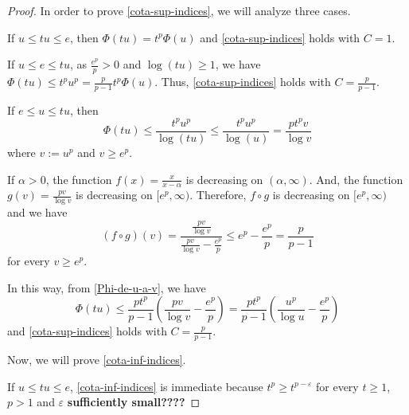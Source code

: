 \documentclass[twoside]{article}
\theoremstyle{remark}
\renewcommand{\leq}{\leqslant}
\begin{document}
\begin{proof}
In order to prove \eqref{cota-sup-indices}, we will analyze three cases.

If $u\leq tu\leq e$, then $\Phi(tu)=t^p\Phi(u)$ and \eqref{cota-sup-indices} holds with $C=1$.

If $u\leq e\leq tu$, as $\frac{e^p}{p}>0$  and $\log(tu)\geq 1$, we have 
$\Phi(tu)\leq t^pu^p= \frac{p}{p-1}t^p\Phi(u)$. Thus, \eqref{cota-sup-indices} holds with $C=\frac{p}{p-1}$.

If $e\leq u\leq tu$, then 
\begin{equation}\label{Phi-de-u-a-v}
\Phi(tu)\leq \frac{t^pu^p}{\log(tu)}\leq \frac{t^pu^p}{\log(u)}=\frac{pt^pv}{\log v}
\end{equation} where $v:=u^p$ and $v\geq e^p$.

If $\alpha>0$, the function $f(x)=\frac{x}{x-\alpha}$ is decreasing on $(\alpha,\infty)$.
And, the function $g(v)=\frac{pv}{\log v}$ is decreasing  on $[e^p,\infty)$. 
Therefore, $f \circ g$ is decreasing on $[e^p,\infty)$ and we have 
\[
(f\circ g)(v)=
\frac{\frac{pv}{\log v}}{\frac{pv}{\log v}-\frac{e^p}{p}}\leq 
e^p-\frac{e^p}{p}=\frac{p}{p-1}
\]
for every $v \geq e^p$.

In this way, from \eqref{Phi-de-u-a-v}, we have
\[
\Phi(tu)\leq \frac{pt^p}{p-1}\left(\frac{pv}{\log v}-\frac{e^p}{p}\right)=
 \frac{pt^p}{p-1}\left(\frac{u^p}{\log u}-\frac{e^p}{p}\right)
\]
and \eqref{cota-sup-indices} holds with $C=\frac{p}{p-1}$.

Now, we will prove \eqref{cota-inf-indices}.

If $u\leq tu \leq e$, \eqref{cota-inf-indices} is immediate because $t^p \geq t^{p-\varepsilon}$ for every $t \geq 1$, $p>1$ and $\varepsilon$ {\bf sufficiently small????}


\end{proof}
\end{document}
